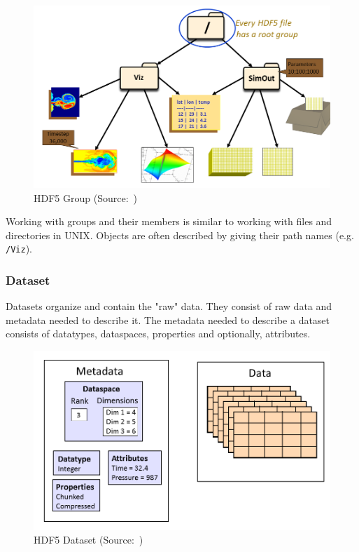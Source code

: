 \documentclass[thesis=M,english]{FITthesis}[2019/12/23]
\begin{document}
\begin{figure}[!h]
    \centering
    \includegraphics[scale=0.3]{static/group.png}
    \caption{HDF5 Group (Source:~\cite{hdf5})}
\end{figure}

Working with groups and their members is similar to working with files and directories in UNIX.
Objects are often described by giving their path names (e.g. \texttt{/Viz}).

\subsubsection{Dataset}

Datasets organize and contain the "raw" data. They consist of raw data and metadata needed to describe it.
The metadata needed to describe a dataset consists of datatypes, dataspaces, properties and optionally,
attributes.

\begin{figure}[H]
    \centering
    \includegraphics[scale=0.3]{static/dataset.png}
    \caption{HDF5 Dataset (Source:~\cite{hdf5})}
\end{figure}
\end{document}
